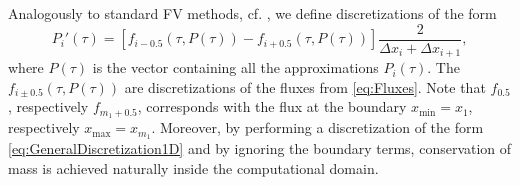 \documentclass[10pt]{article}
\begin{document}
Analogously to standard FV methods, cf. \cite{HV03}, we define discretizations of the form 
\begin{equation}
P_{i}'(\tau) = \left[ f_{i-0.5}(\tau,P(\tau)) - f_{i+0.5}(\tau,P(\tau)) \right] \frac{2}{\Delta x_{i} + \Delta x_{i+1}},
\label{eq:GeneralDiscretization1D}
\end{equation}
where $P(\tau)$ is the vector containing all the approximations $P_{i}(\tau)$.
The $f_{i \pm 0.5}(\tau,P(\tau))$ are discretizations of the fluxes from \eqref{eq:Fluxes}.
Note that $f_{0.5}$, respectively $f_{m_{1}+0.5}$, corresponds with the flux at the boundary $x_{\min}=x_{1}$, respectively $x_{\max} = x_{m_{1}}$. Moreover, by performing a discretization of the form \eqref{eq:GeneralDiscretization1D} and by ignoring the boundary terms, conservation of mass is achieved naturally inside the computational domain. 
\end{document}
